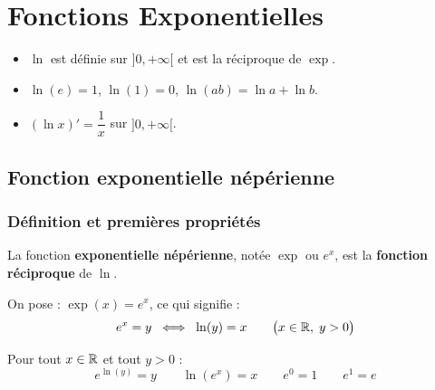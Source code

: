 
\chapter{Fonctions Exponentielles}

\begin{rappel}
  \begin{itemize}
    \item $\ln$ est d\'{e}finie sur $]0,+\infty[$ et est la r\'{e}ciproque de $\exp$.
    \item $\ln(e) = 1$, \quad $\ln(1) = 0$, \quad $\ln(ab) = \ln a + \ln b$.
    \item $(\ln x)' = \dfrac{1}{x}$ sur $]0,+\infty[$.
  \end{itemize}
\end{rappel}

\section{Fonction exponentielle n\'{e}p\'{e}rienne}

\subsection{D\'{e}finition et premi\`{e}res propri\'{e}t\'{e}s}

\begin{definition}
  La fonction \textbf{exponentielle n\'{e}p\'{e}rienne}, not\'{e}e $\exp$ ou $e^x$,
  est la \textbf{fonction r\'{e}ciproque} de $\ln$.

  \medskip
  On pose : $\exp(x) = e^x$, ce qui signifie :
  \[
    e^x = y \;\iff\; \ln(y) = x
    \qquad \bigl(x \in \mathbb{R},\; y > 0\bigr)
  \]
\end{definition}

\begin{propriete}
  Pour tout $x \in \mathbb{R}$ et tout $y > 0$ :
  \[
    e^{\ln(y)} = y \qquad \ln(e^x) = x \qquad e^0 = 1 \qquad e^1 = e
  \]
\end{propriete}
\newpage

